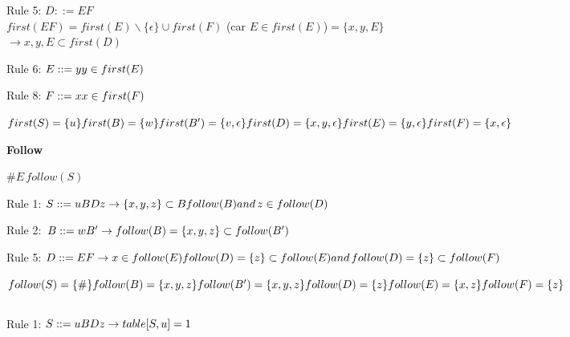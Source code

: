             Rule 5: $D::= EF$\\
            $first(EF) = first(E) \backslash \{\epsilon\} \cup first(F)$ (car $E\in first(E)$)$=\{x,y,E\}$\\
            $\rightarrow {x,y,E} \subset first(D)$
            
            Rule 6: $E::= y\\
            y \in first(E)$
            
            Rule 8: $F::=x\\
            x \in first(F)$
            
            $first(S) = \{u\}\\
            first(B) = \{w\}\\
            first(B') = \{v,\epsilon\}\\
            first(D) = \{x,y,\epsilon\}\\
            first(E) = \{y,\epsilon\}\\
            first(F) = \{x, \epsilon\}$
            
            \textbf{Follow}
            
            $\#E \, follow(S)$
            
            Rule 1: $S::= uBDz\\
            \rightarrow \{x,y,z\} \subset B follow(B)\\
            and \, z \in follow(D)$
            
            Rule 2: $\, B::= wB'\\
            \rightarrow follow(B)=\{x,y,z\} \subset follow(B')$
            
            Rule 5: $D::=EF\\
            \rightarrow x \in follow(E)\\
            follow(D) = \{z\} \subset follow(E)\\
            and \, follow(D) = \{z\} \subset follow(F)$
             
            $follow(S) = \{\#\}\\
            follow(B) = \{x,y,z\}\\
            follow(B') = \{x,y,z\}\\
            follow(D) = \{z\}\\
            follow(E) = \{x,z\}\\
            follow(F) = \{z\}$
\subsection{}
          Rule 1: $S::= uBDz\\
            \rightarrow table[S,u] = 1$
            
